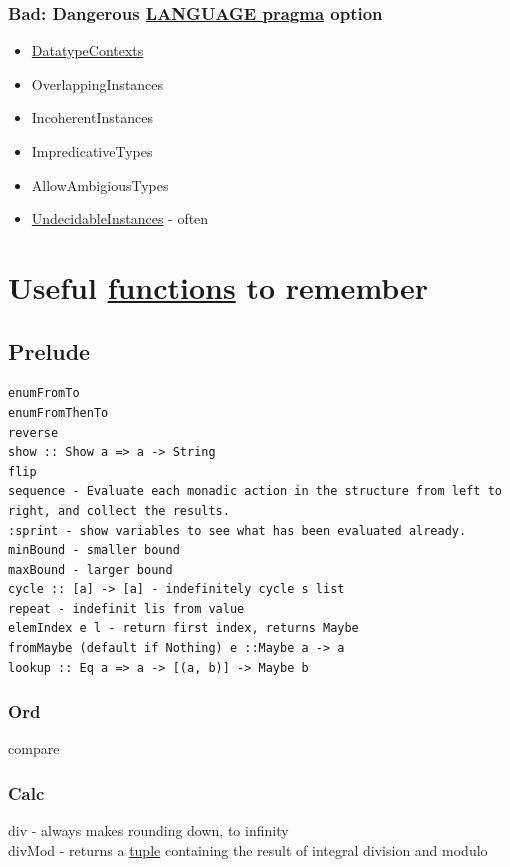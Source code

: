 \documentclass[11pt]{article}
\begin{document}
\subsubsection{Bad: Dangerous \hyperref[orgc3b3746]{LANGUAGE pragma} option}
\label{sec:orgd6d2e65}

\begin{itemize}
\item \hyperref[org805bbd3]{DatatypeContexts}\\
\item OverlappingInstances\\
\item IncoherentInstances\\
\item ImpredicativeTypes\\
\item AllowAmbigiousTypes\\
\item \hyperref[orgf388a67]{UndecidableInstances} - often\\
\end{itemize}

\section{Useful \hyperref[orgaa8fb87]{functions} to remember}
\label{sec:org876a503}

\subsection{Prelude}
\label{sec:org2e16994}
\begin{verbatim}
enumFromTo
enumFromThenTo
reverse
show :: Show a => a -> String
flip
sequence - Evaluate each monadic action in the structure from left to right, and collect the results.
:sprint - show variables to see what has been evaluated already.
minBound - smaller bound
maxBound - larger bound
cycle :: [a] -> [a] - indefinitely cycle s list
repeat - indefinit lis from value
elemIndex e l - return first index, returns Maybe
fromMaybe (default if Nothing) e ::Maybe a -> a
lookup :: Eq a => a -> [(a, b)] -> Maybe b
\end{verbatim}

\subsubsection{Ord}
\label{sec:org29e6ba6}
compare\\

\subsubsection{Calc}
\label{sec:org2e87a90}
div - always makes rounding down, to infinity\\
divMod - returns a \hyperref[orgdf7eddf]{tuple} containing the result of integral division and modulo\\
\end{document}
